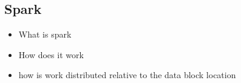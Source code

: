 \subsection{Spark}

\begin{itemize}
\item  What is spark
\item  How does it work
\item  how is work distributed relative to the data block location
\end{itemize}


